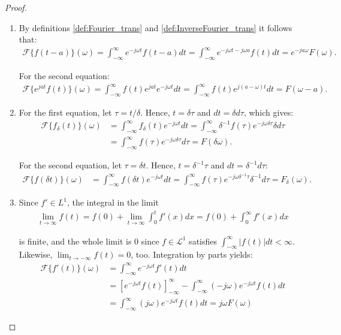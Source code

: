 \begin{proof}
\begin{enumerate}[label=(\alph*)]
\item
By definitions \ref{def:Fourier_trans} and \ref{def:InverseFourier_trans} it follows that:
\begin{align*}
\mathcal{F}\{f(t-a)\}(\omega) = \int_{-\infty}^\infty e^{-j\omega t} f(t - a) dt = \int_{-\infty}^\infty e^{-j\omega t - j\omega a} f(t) dt = e^{-ja \omega} F(\omega).
\end{align*}

For the second equation:
\begin{align*}
\mathcal{F}\{e^{jat} f(t)\}(\omega) = \int_{-\infty}^\infty f(t) e^{jat} e^{-j \omega t} dt = \int_{-\infty}^\infty f(t) e^{j(a- \omega)t} dt = F(\omega - a).
\end{align*}

\item For the first equation, let $\tau = t/\delta$. Hence, $t = \delta \tau$ and $dt = \delta d\tau$, which gives:
\begin{align*}
\mathcal{F}\{f_\delta(t)\}(\omega) &= \int_{-\infty}^\infty f_\delta(t) e^{-j \omega t} dt = \int_{-\infty}^\infty \delta^{-1}f(\tau) e^{-j \omega \delta\tau} \delta d\tau \\
&= \int_{-\infty}^\infty f(\tau) e^{-j \omega \delta\tau} d\tau = F(\delta\omega).
\end{align*}

For the second equation, let $\tau = \delta t$. Hence, $t = \delta^{-1}\tau$ and $dt = \delta^{-1} d\tau$:
\begin{align*}
\mathcal{F}\{f(\delta t)\}(\omega) &= \int_{-\infty}^\infty f(\delta t) e^{-j \omega t} dt = \int_{-\infty}^\infty f(\tau) e^{-j \omega \delta^{-1}\tau} \delta^{-1} d\tau = F_\delta(\omega).
\end{align*}

\item Since $f' \in L^1$, the integral in the limit
\begin{align*}
\lim_{t \to \infty} f(t) = f(0) + \lim_{t\to\infty} \int_0^t f'(x) dx = f(0) + \int_0^\infty f'(x) dx
\end{align*}

is finite, and the whole limit is 0 since $f \in \mathcal{L}^1$ satisfies $\int_{-\infty}^\infty |f(t)| dt < \infty$. Likewise, $\displaystyle{\lim_{t \to -\infty} f(t) = 0}$, too. Integration by parts yields:
\begin{align*}
\mathcal{F}\{f'(t)\}(\omega) &= \int_{-\infty}^\infty e^{-j \omega t} f'(t) dt \\
&= \left[ e^{-j\omega t} f(t) \right]_{-\infty}^\infty - \int_{-\infty}^\infty (-j \omega) e^{-j \omega t} f(t) dt \\
&= \int_{-\infty}^\infty (j \omega) e^{-j \omega t} f(t) dt = j\omega F(\omega)
\end{align*}


\end{enumerate}
\end{proof}
